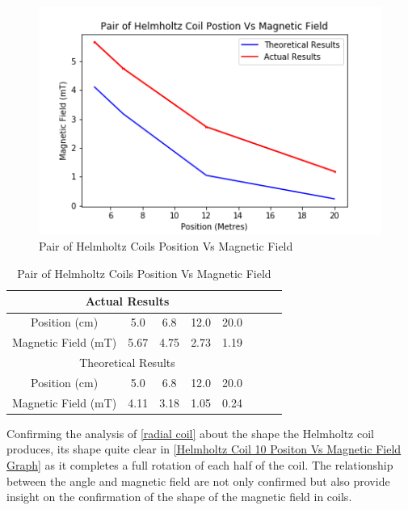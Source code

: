 \documentclass[12pt]{article}
\begin{document}
\begin{figure}[H]
\centering
\includegraphics[scale=0.7]{Images/Helmholtz_Coils/Pair_Helmholtz_Coil_Position_Vs_Magnetic_Field.png}
\caption{Pair of Helmholtz Coils Position Vs Magnetic Field}
\label{Pair of Helmholtz Coils Position Vs Magnetic Field Graph}
\end{figure}

\begin{table}[H]
\begin{center}
 \begin{tabular}{|c||c|c|c|c|c|c|c|}
 \hline
 \multicolumn{5}{|c|}{Actual Results} \\
 \hline
 Position (cm) & 5.0 & 6.8 & 12.0 & 20.0 \\
 \hline
 Magnetic Field (mT) & 5.67 & 4.75 & 2.73 & 1.19 \\
 \hline
 \hline
 \multicolumn{5}{|c|}{Theoretical Results} \\
 \hline
 Position (cm) & 5.0 & 6.8 & 12.0 & 20.0 \\
 \hline
 Magnetic Field (mT) & 4.11 & 3.18 & 1.05 & 0.24 \\
 \hline
 \end{tabular}
 \caption{Pair of Helmholtz Coils Position Vs Magnetic Field}
 \label{Pair of Helmholtz Coils Position Vs Magnetic Field Table}
\end{center}
\end{table}

Confirming the analysis of \cref{radial coil} about the shape the Helmholtz coil produces, its shape quite clear in \cref{Helmholtz Coil 10 Positon Vs Magnetic Field Graph} as it completes a full rotation of each half of the coil. The relationship between the angle and magnetic field are not only confirmed but also provide insight on the confirmation of the shape of the magnetic field in coils. \\
\end{document}
